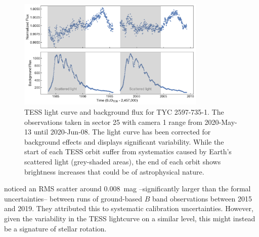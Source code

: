 \documentclass[linenumbers]{aastex631}
\begin{document}
\begin{figure}
    \centering
    \includegraphics[width=0.8\textwidth]{figures/TESS_light_curve.pdf}
    \caption{TESS light curve and background flux for TYC 2597-735-1. The observations taken in sector 25 with camera 1 range from 2020-May-13 until 2020-Jun-08. The light curve has been corrected for background effects and displays significant variability. While the start of each TESS orbit suffer from systematics caused by Earth's scattered light (grey-shaded areas), the end of each orbit shows brightness increases that could be of astrophysical nature.
    \label{fig:TESS_light_curve}}
\end{figure}

\cite{2020Natur.587..387H} noticed an RMS scatter around 0.008~mag --significantly larger than the formal uncertainties-- between runs of ground-based $B$ band observations between 2015 and 2019. They attributed this to systematic calibration uncertainties. However, given the variability in the TESS lightcurve on a similar level, this might instead be a signature of stellar rotation.
\end{document}
